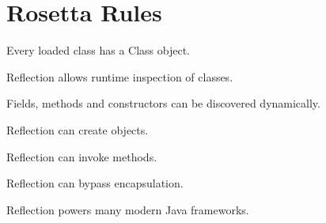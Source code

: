 \documentclass[11pt,a4paper]{book}
\begin{document}
\section{Rosetta Rules}

\begin{rosettarule}

Every loaded class has a
Class object.

\end{rosettarule}


\begin{rosettarule}

Reflection allows runtime
inspection of classes.

\end{rosettarule}


\begin{rosettarule}

Fields, methods and constructors
can be discovered dynamically.

\end{rosettarule}


\begin{rosettarule}

Reflection can create objects.

\end{rosettarule}


\begin{rosettarule}

Reflection can invoke methods.

\end{rosettarule}


\begin{rosettarule}

Reflection can bypass
encapsulation.

\end{rosettarule}


\begin{rosettarule}

Reflection powers many
modern Java frameworks.

\end{rosettarule}
\end{document}
